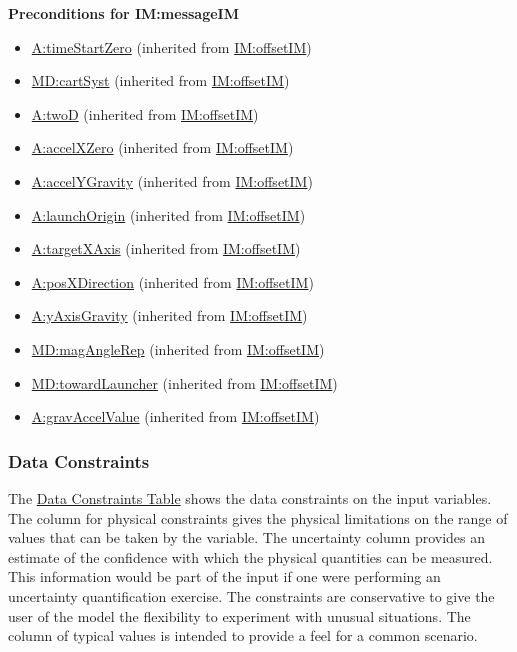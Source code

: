 \documentclass[12pt]{article}
\begin{document}
\noindent \textbf{Preconditions for IM:messageIM}
\begin{itemize}
\item \hyperref[timeStartZero]{A:timeStartZero} (inherited from \hyperref[IM:offsetIM]{IM:offsetIM})
\item \hyperref[MD:cartSyst]{MD:cartSyst} (inherited from \hyperref[IM:offsetIM]{IM:offsetIM})
\item \hyperref[twoD]{A:twoD} (inherited from \hyperref[IM:offsetIM]{IM:offsetIM})
\item \hyperref[accelXZero]{A:accelXZero} (inherited from \hyperref[IM:offsetIM]{IM:offsetIM})
\item \hyperref[accelYGravity]{A:accelYGravity} (inherited from \hyperref[IM:offsetIM]{IM:offsetIM})
\item \hyperref[launchOrigin]{A:launchOrigin} (inherited from \hyperref[IM:offsetIM]{IM:offsetIM})
\item \hyperref[targetXAxis]{A:targetXAxis} (inherited from \hyperref[IM:offsetIM]{IM:offsetIM})
\item \hyperref[posXDirection]{A:posXDirection} (inherited from \hyperref[IM:offsetIM]{IM:offsetIM})
\item \hyperref[yAxisGravity]{A:yAxisGravity} (inherited from \hyperref[IM:offsetIM]{IM:offsetIM})
\item \hyperref[MD:magAngleRep]{MD:magAngleRep} (inherited from \hyperref[IM:offsetIM]{IM:offsetIM})
\item \hyperref[MD:towardLauncher]{MD:towardLauncher} (inherited from \hyperref[IM:offsetIM]{IM:offsetIM})
\item \hyperref[gravAccelValue]{A:gravAccelValue} (inherited from \hyperref[IM:offsetIM]{IM:offsetIM})

\end{itemize}

\subsubsection{Data Constraints}
\label{Sec:DataConstraints}
The \hyperref[Table:InDataConstraints]{Data Constraints Table} shows the data constraints on the input variables. The column for physical constraints gives the physical limitations on the range of values that can be taken by the variable. The uncertainty column provides an estimate of the confidence with which the physical quantities can be measured. This information would be part of the input if one were performing an uncertainty quantification exercise. The constraints are conservative to give the user of the model the flexibility to experiment with unusual situations. The column of typical values is intended to provide a feel for a common scenario.
\end{document}
